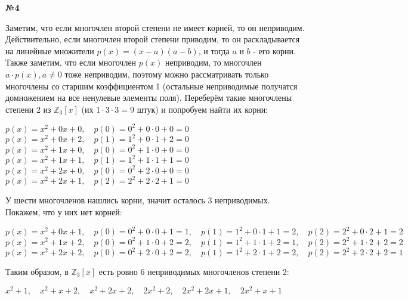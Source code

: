 \documentclass{article}
\newenvironment{task}{\begin{center}\fontsize{14}{14}\selectfont\bf}{\rm\fontsize{12}{12}\selectfont\end{center}}
\begin{document}
	\begin{task} 
		№4
	\end{task}
	Заметим, что если многочлен второй степени не имеет корней, то он неприводим. Действительно, если многочлен второй степени приводим, то он раскладывается на линейные множители $p(x) = (x-a)(a-b)$, и тогда $a$ и $b$ - его корни. Также заметим, что если многочлен $p(x)$ неприводим, то многочлен $a\cdot p(x), a\not=0$ тоже неприводим, поэтому можно рассматривать только многочлены со старшим коэффициентом 1 (остальные неприводимые получатся домножением на все ненулевые элементы поля). Переберём такие многочлены степени 2 из $\mathbb{Z}_3[x]$ (их $1\cdot3\cdot3 = 9$ штук) и попробуем найти их корни:
	\begin{center}
		$p(x) = x^2 + 0x + 0, \quad p(0) = 0^2 + 0 \cdot 0 + 0 = 0$ \\
		$p(x) = x^2 + 0x + 2, \quad p(1) = 1^2 + 0 \cdot 1 + 2 = 0$ \\
		$p(x) = x^2 + 1x + 0, \quad p(0) = 0^2 + 1 \cdot 0 + 0 = 0$ \\
		$p(x) = x^2 + 1x + 1, \quad p(1) = 1^2 + 1 \cdot 1 + 1 = 0$ \\
		$p(x) = x^2 + 2x + 0, \quad p(0) = 0^2 + 2 \cdot 0 + 0 = 0$ \\
		$p(x) = x^2 + 2x + 1, \quad p(2) = 2^2 + 2 \cdot 2 + 1 = 0$ \\
	\end{center}	
	У шести многочленов нашлись корни, значит осталось 3 неприводимых. Покажем, что у них нет корней:
	\begin{center}
	$p(x) = x^2 + 0x + 1, \quad p(0) = 0^2 + 0 \cdot 0 + 1 = 1, \quad p(1) = 1^2 + 0 \cdot 1 + 1 = 2, \quad p(2) = 2^2 + 0 \cdot 2 + 1 = 2$ \\
	$p(x) = x^2 + 1x + 2, \quad p(0) = 0^2 + 1 \cdot 0 + 2 = 2, \quad p(1) = 1^2 + 1 \cdot 1 + 2 = 1, \quad p(2) = 2^2 + 1 \cdot 2 + 2 = 2$ \\
	$p(x) = x^2 + 2x + 2, \quad p(0) = 0^2 + 2 \cdot 0 + 2 = 2, \quad p(1) = 1^2 + 2 \cdot 1 + 2 = 2, \quad p(2) = 2^2 + 2 \cdot 2 + 2 = 1$ \\
	\end{center}
	Таким образом, в $\mathbb{Z}_3[x]$ есть ровно 6 неприводимых многочленов степени 2:
	\begin{center}
	$x^2 + 1, \quad x^2 + x + 2, \quad x^2 + 2x + 2, \quad 2x^2 + 2, \quad 2x^2 + 2x + 1, \quad 2x^2 + x + 1$
	\end{center}
	
\end{document}
